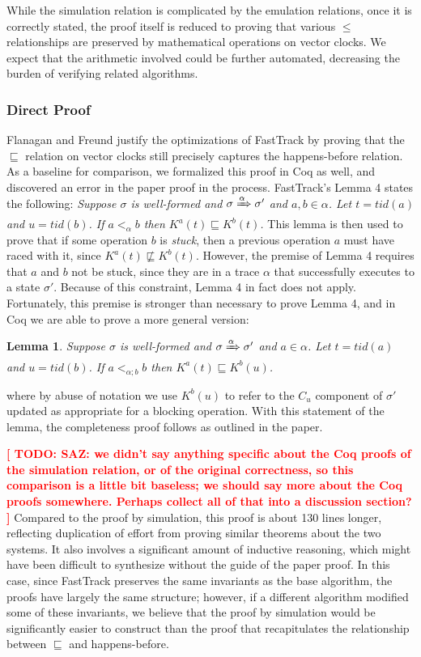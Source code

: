 \documentclass[preprint, 10pt]{sigplanconf}
\newcommand{\TODO}[1]{\textbf{\textcolor{red}{[ TODO: #1]}}}
\newtheorem{lemma}{Lemma}
\begin{document}
While the simulation relation is complicated by the emulation relations, once it is correctly stated, the proof itself is reduced to proving that various $\le$ relationships are preserved by mathematical operations on vector clocks. We expect that the arithmetic involved could be further automated, decreasing the burden of verifying related algorithms.

\subsubsection{Direct Proof}
\label{bug}
Flanagan and Freund justify the optimizations of FastTrack by proving that the $\sqsubseteq$ relation on vector clocks still precisely captures the happens-before relation. As a baseline for comparison, we formalized this proof in Coq as well, and discovered an error in the paper proof in the process. FastTrack's Lemma 4 states the following: {\it Suppose $\sigma$ is well-formed and $\sigma \xRightarrow{\alpha} \sigma'$ and $a, b \in \alpha$. Let $t = \mathit{tid}(a)$ and $u = \mathit{tid}(b)$. If $a <_{\alpha} b$ then $K^a(t) \sqsubseteq K^b(t)$.} This lemma is then used to prove that if some operation $b$ is \emph{stuck}, then a previous operation $a$ must have raced with it, since $K^a(t) \not\sqsubseteq K^b(t)$. However, the premise of Lemma 4 requires that $a$ and $b$ not be stuck, since they are in a trace $\alpha$ that successfully executes to a state $\sigma'$. Because of this constraint, Lemma 4 in fact does not apply. Fortunately, this premise is stronger than necessary to prove Lemma 4, and in Coq we are able to prove a more general version:
\begin{lemma}Suppose $\sigma$ is well-formed and $\sigma \xRightarrow{\alpha} \sigma'$ and $a \in \alpha$. Let $t = \mathit{tid}(a)$ and $u = \mathit{tid}(b)$. If $a <_{\alpha; b} b$ then $K^a(t) \sqsubseteq K^b(u)$.\end{lemma}
\noindent where by abuse of notation we use $K^b(u)$ to refer to the $C_u$ component of $\sigma'$ updated as appropriate for a blocking operation. With this statement of the lemma, the completeness proof follows as outlined in the paper.

\TODO{SAZ: we didn't say anything specific about the Coq proofs of the simulation relation, or of the original correctness, so this comparison is a little bit baseless; we should say more about the Coq proofs somewhere. Perhaps collect all of that into a discussion section? }
Compared to the proof by simulation, this proof is about 130 lines longer, reflecting duplication of effort from proving similar theorems about the two systems. It also involves a significant amount of inductive reasoning, which might have been difficult to synthesize without the guide of the paper proof. In this case, since FastTrack preserves the same invariants as the base algorithm, the proofs have largely the same structure; however, if a different algorithm modified some of these invariants, we believe that the proof by simulation would be significantly easier to construct than the proof that recapitulates the relationship between $\sqsubseteq$ and happens-before.
\end{document}
